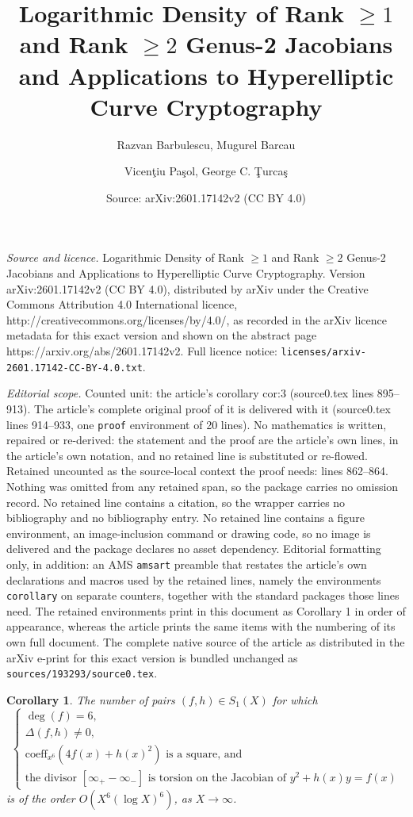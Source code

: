 \documentclass[10pt,a4paper]{amsart}
\title{Logarithmic Density of Rank $\geq 1$ and Rank $\geq 2$ Genus-2 Jacobians and Applications to Hyperelliptic Curve Cryptography}
\author{Razvan Barbulescu, Mugurel Barcau \and Vicen\c tiu Pa\c sol, George C. \c Turca\c s}
\date{Source: arXiv:2601.17142v2 (CC BY 4.0)}
\newtheorem{corollary}{Corollary}
\begin{document}
\maketitle

\noindent\emph{Source and licence.} Logarithmic Density of Rank $\geq 1$ and Rank $\geq 2$ Genus-2 Jacobians and Applications to Hyperelliptic Curve Cryptography. Version arXiv:2601.17142v2 (CC BY 4.0), distributed by arXiv under the Creative Commons Attribution 4.0 International licence, http://creativecommons.org/licenses/by/4.0/, as recorded in the arXiv licence metadata for this exact version and shown on the abstract page https://arxiv.org/abs/2601.17142v2. Full licence notice: \texttt{licenses/arxiv-2601.17142-CC-BY-4.0.txt}.\par\smallskip

\noindent\textit{Editorial scope.} Counted unit: the article's corollary cor:3 (source0.tex lines 895--913). The article's complete original proof of it is delivered with it (source0.tex lines 914--933, one \texttt{proof} environment of 20 lines). No mathematics is written, repaired or re-derived: the statement and the proof are the article's own lines, in the article's own notation, and no retained line is substituted or re-flowed.  Retained uncounted as the source-local context the proof needs: lines 862--864.  Nothing was omitted from any retained span, so the package carries no omission record.  No retained line contains a citation, so the wrapper carries no bibliography and no bibliography entry.  No retained line contains a figure environment, an image-inclusion command or drawing code, so no image is delivered and the package declares no asset dependency.  Editorial formatting only, in addition: an AMS \texttt{amsart} preamble that restates the article's own declarations and macros used by the retained lines, namely the environments \texttt{corollary} on separate counters, together with the standard packages those lines need.  The retained environments print in this document as Corollary 1 in order of appearance, whereas the article prints the same items with the numbering of its own full document.  The complete native source of the article as distributed in the arXiv e-print for this exact version is bundled unchanged as \texttt{sources/193293/source0.tex}.
\begin{corollary} \label{cor:s1box} The number of pairs $(f,h) \in S_1(X)$ for which $$\left\{ \begin{array}{l} \deg(f) = 6, \\ \Delta(f,h) \neq 0, \\ \mathrm{coeff}_{x^6}(4f(x)+h(x)^2) \text{ is a square, and } \\ \text{the divisor } [\infty_{+} - \infty_{-}] \text{ is torsion on the Jacobian of } y^2+h(x)y=f(x)  \end{array} \right. $$
is of the order $O(X^6(\log X)^6)$, as $X\to \infty$.
\end{corollary}
\end{document}
